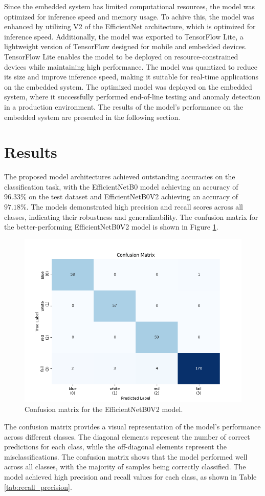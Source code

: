 \documentclass[lettersize,journal]{IEEEtran}
\begin{document}
Since the embedded system has limited computational resources, the model was optimized for inference speed and memory usage. To achive this, the model was enhanced by utilizing V2 of the EfficientNet architecture, which is optimized for inference speed. Additionally, the model was exported to TensorFlow Lite, a lightweight version of TensorFlow designed for mobile and embedded devices. TensorFlow Lite enables the model to be deployed on resource-constrained devices while maintaining high performance. The model was quantized to reduce its size and improve inference speed, making it suitable for real-time applications on the embedded system. The optimized model was deployed on the embedded system, where it successfully performed end-of-line testing and anomaly detection in a production environment. The results of the model's performance on the embedded system are presented in the following section.


\section{Results}

The proposed model architectures achieved outstanding accuracies on the classification task, with the EfficientNetB0 model achieving an accuracy of $96.33\%$ on the test dataset and EfficientNetB0V2 achieving an accuracy of $97.18\%$. The models demonstrated high precision and recall scores across all classes, indicating their robustness and generalizability. The confusion matrix for the better-performing EfficientNetB0V2 model is shown in Figure \ref{fig:confusion_matrix}.

\begin{figure}[!h]
  \centering
  \includegraphics[width=.5\textwidth]{../plots/confusion_matrix.png}
  \caption{Confusion matrix for the EfficientNetB0V2 model.}
  \label{fig:confusion_matrix}
\end{figure}

The confusion matrix provides a visual representation of the model's performance across different classes. The diagonal elements represent the number of correct predictions for each class, while the off-diagonal elements represent the misclassifications. The confusion matrix shows that the model performed well across all classes, with the majority of samples being correctly classified. The model achieved high precision and recall values for each class, as shown in Table \ref{tab:recall_precision}.
\end{document}
